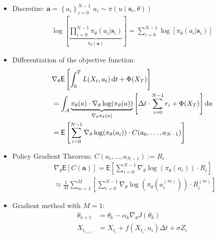 \documentclass[a4paper,12pt, oneside, twocolumn]{scrartcl}
\newcommand{\dt}{\thinspace \mathrm{d}t}
\begin{document}
\begin{itemize}
    \item[3.] Discretize: $\bm{a} = \left\{ a_i \right\}_{i=0}^{N-1}$ $a_i \sim \pi(u(\bm{s}_i, \theta))$ 
    \small{
        \begin{align*}
        \log\left[
            \underbrace{
                \prod_{i=0}^{N-1} \pi_{\theta}(a_i | \bm{s}_i) 
            }_{
                \pi_{\theta}(\bm{a})
            }
        \right] 
        = 
        \sum_{i=0}^{N-1} \log\left[\pi_{\theta}(a_i | \bm{s}_i)\right]
    \end{align*}
    }
    \item[4.] Differentiation of the objective function:
    \begin{align*}
        &\nabla_{\theta}
        \mathsf{E}
        \left[
            \int_0^T L(X_t,a_t) \dt + \Phi(X_T)  
        \right]
        \\
        &=
        \int_{\mathcal{A}}
        \underbrace{
            \pi_{\theta}(a) \cdot \nabla_{\theta} \log(\pi_{\theta}(a))
        }_{
            \nabla_{\theta} \pi_{\theta}(a)
        }
        \left[
           \Delta t \cdot \sum_{i=0}^{N-1} r_i + \Phi(X_T)
        \right]
        \mathrm{d}a
        \\
        &=
        \mathsf{E}
        \left[
            \sum_{i=0}^{N-1}
            \nabla_{\theta} 
            \log(\pi_{\theta}(a_i))
            \cdot
            C(a_0 , \ldots, a_{N-1})
        \right]
    \end{align*}
    \item[5.] Policy Gradient Theorem: $ C(a_i, \ldots, a_{N-1}) := R_i$
    \begin{align*}
        &\nabla_{\theta} \mathsf{E}
        \left[
            C(\bm{a})
        \right]
        = \mathsf{E}
        \left[
            \sum_{i=0}^{N-1} \nabla_{\theta} 
            \log\left(\pi_{\theta}(a_i)\right)
            \cdot
            R_i
        \right]
        \\
        &\approx
        \frac{1}{M} \sum_{m=1}^M
        \left[
            \sum_{i=0}^{N-1} 
            \nabla_{\theta} 
            \log\left(\pi_{\theta}(a_i^{(m)})\right)
            \cdot
            R_i^{(m)}
        \right]
    \end{align*}
    \item[5.] Gradient method \cite{Plaat_RL} with $M=1$:
    \begin{align*}
        \theta_{k+1} &= \theta_k - \alpha_k \nabla_{\theta} J(\theta_k)
        \\
        X_{t_{i+1}} 
        &= X_{t_i} + f(X_{t_i},u_i) \Delta t + \sigma Z_i
    \end{align*}
\end{itemize}
\end{document}

